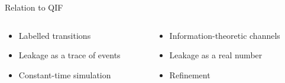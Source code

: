 
\begin{frame}{Relation to QIF}
\begin{columns}
    \begin{column}{.5\textwidth}
        \begin{itemize}
            \item<+-| alert@+> Labelled transitions
            \item<+-| alert@+> Leakage as a trace of events
            \item<+-| alert@+> Constant-time simulation
        \end{itemize}
    \end{column}
    \addtocounter{beamerpauses}{-3}
    \begin{column}{.5\textwidth}
        \begin{itemize}
            \item<+-| alert@+> Information-theoretic channels
            \item<+-| alert@+> Leakage as a real number
            \item<+-| alert@+> Refinement
        \end{itemize}
    \end{column}
\end{columns}
\end{frame}